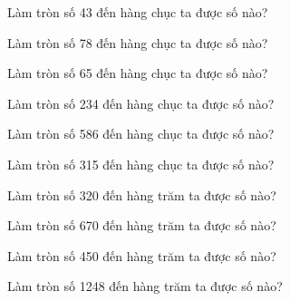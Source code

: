 \begin{ex}
Làm tròn số 43 đến hàng chục ta được số nào?
\end{ex}

\begin{ex}
Làm tròn số 78 đến hàng chục ta được số nào?
\end{ex}

\begin{ex}
Làm tròn số 65 đến hàng chục ta được số nào?
\end{ex}

\begin{ex}
Làm tròn số 234 đến hàng chục ta được số nào?
\end{ex}

\begin{ex}
Làm tròn số 586 đến hàng chục ta được số nào?
\end{ex}

\begin{ex}
Làm tròn số 315 đến hàng chục ta được số nào?
\end{ex}

\begin{ex}
Làm tròn số 320 đến hàng trăm ta được số nào?
\end{ex}

\begin{ex}
Làm tròn số 670 đến hàng trăm ta được số nào?
\end{ex}

\begin{ex}
Làm tròn số 450 đến hàng trăm ta được số nào?
\end{ex}

\begin{ex}
Làm tròn số 1248 đến hàng trăm ta được số nào?
\end{ex}

